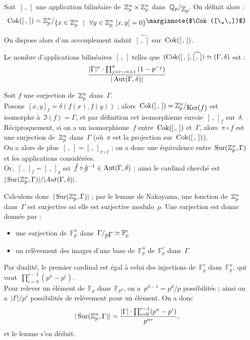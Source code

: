 Soit~$[\,,\,]$ une application bilinéaire de~$\mathbb{Z}_p^n\times\mathbb{Z}_p^n$ dans~$\quotient{\mathbb Q_p}{\Zp}$. On définit alors :
\[ \Cok([\,,\,]) = \quotient{\Zp^n}{\{ x\in\Zp^n\ \ |\ \ \forall y\in\Zp^n\ [x,y]=0 \}} \text{\marginnote{$\Cok([\,,\,])$}}\]

\begin{rem}
On dispose alors d'un accouplement induit~${\widehat{[\,,\,]}}$ sur~$\operatorname{Cok}([\,,\,])$.
\end{rem}

\begin{lem}
Le nombre d'applications bilinéaires~$[\,,\,]$ telles que~$(\operatorname{Cok}([\,,\,], \widehat{[\,,\,]}) \simeq (\Gamma, \delta)$ est :
\[ \frac{|\Gamma|^n\cdot\prod_{j=r-n+1}^{n}{(1-p^{-j})}}{|\operatorname{Aut}(\Gamma, \delta)|} \]
\end{lem}
\begin{dem}
Soit $f$ une surjection de~$\mathbb{Z}_p^n$ dans~$\Gamma$.\\
Posons~$[x,y]_f = \delta(f(x),f(y))$ ; alors~$\Cok([\,,\,]) = \quotient{\Zp^n}{\Ker(f)}$ est isomorphe à~$\Im(f)=\Gamma$, et par définition cet isomorphisme envoie~$[\,,\,]_f$ sur~$\delta$.\\
Réciproquement, si on a un isomorphisme~$f$ entre~$\operatorname{Cok}([\,,\,])$ et~$\Gamma$, alors~$\pi\circ f$ est une surjection de~$\mathbb{Z}_p^n$ dans~$\Gamma$ (où~$\pi$ est la projection sur~$\operatorname{Cok}([\,,\,])$).\\
On a alors de plus~$[\,,\,] = [\,,\,]_{\pi\circ f}$ ; on a donc une équivalence entre~$\operatorname{Sur}(\mathbb{Z}_p^n, \Gamma)$ et les applications considérées.\\
Or,~$[\,,\,]_f = [\,,\,]_g$  ssi~$\hat f\circ \hat g^{-1}\in \operatorname{Aut}(\Gamma, \delta)$ ; ainsi le cardinal cherché est~$|\operatorname{Sur}(\mathbb{Z}_p^n,\Gamma)|/|Aut(\Gamma, \delta)|$.

Calculons donc~$|\operatorname{Sur}(\mathbb{Z}_p^n,\Gamma)|$ ; par le lemme de Nakayama, une fonction de~$\mathbb{Z}_p^n$ dans~$\Gamma$ est surjective ssi elle est surjective modulo~$p$. Une surjection est donnc donnée par :
\begin{itemize}
\item une surjection de~$\mathbb{F}_p^n$ dans~$\quotient{\Gamma}{p\Gamma}\simeq\mathbb{F}_p^r$
\item un relèvement des images d'une base de~$\mathbb F_p^n$ de~$\mathbb F_p^r$ dans~$\Gamma$
\end{itemize}
Par dualité, le premier cardinal est égal à celui des injections de~$\mathbb F_p^r$ dans~$\mathbb F_p^n$, qui vaut~$\prod_{i=0}^{r-1}{(p^n-p^i)}$.\\
Pour relever un élément de~$\mathbb F_p$ dans~$\mathbb F_{p^d}$, on a~$p^{d-1}=p^d/p$ possibilités ; ainsi on a~$|\Gamma|/p^r$ possibilités de relèvement pour un élément. On a donc
\[ |\operatorname{Sur}(\mathbb{Z}_p^n, \Gamma)| = \frac{|\Gamma|\cdot \prod_{i=0}^{r-1}(p^n-p^i)}{p^{nr}}, \]
et le lemme s'en déduit.
\end{dem}

